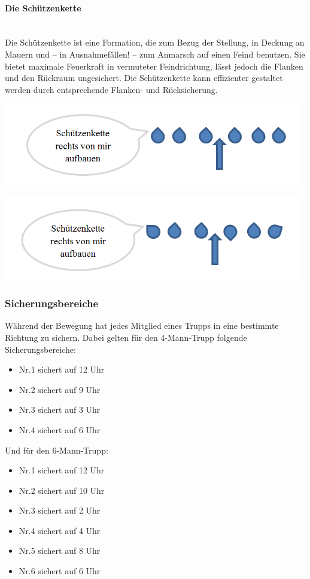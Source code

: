 \paragraph{Die Schützenkette}$\ $\\
Die Schützenkette ist eine Formation, die zum Bezug der Stellung, in Deckung an Mauern und -- in Ausnahmefällen! -- zum Anmarsch auf einen Feind benutzen. Sie bietet maximale Feuerkraft in vermuteter Feindrichtung, lässt jedoch die Flanken und den Rückraum ungesichert. Die Schützenkette kann effizienter gestaltet werden durch entsprechende Flanken- und Rücksicherung.\\
\begin{minipage}[t]{1\textwidth}
	\includegraphics[width=13cm]{./Grafiken/Abschnitt/Schuetzenkette1.png}
\end{minipage}
\begin{minipage}[t]{1\textwidth}
	\includegraphics[width=13cm]{./Grafiken/Abschnitt/Schuetzenkette2.png}
\end{minipage}
\subsubsection{Sicherungsbereiche}
Während der Bewegung hat jedes Mitglied eines Trupps in eine bestimmte Richtung zu sichern. Dabei gelten für den 4-Mann-Trupp folgende Sicherungsbereiche:
\begin{itemize}
	\item Nr.1 sichert auf 12 Uhr 
	\item Nr.2 sichert auf 9 Uhr 
	\item Nr.3 sichert auf 3 Uhr 
	\item Nr.4 sichert auf 6 Uhr 
\end{itemize}
Und für den 6-Mann-Trupp:
\begin{itemize}
	\item Nr.1 sichert auf 12 Uhr 
	\item Nr.2 sichert auf 10 Uhr 
	\item Nr.3 sichert auf 2 Uhr 
	\item Nr.4 sichert auf 4 Uhr 
	\item Nr.5 sichert auf 8 Uhr
	\item Nr.6 sichert auf 6 Uhr 
\end{itemize}
